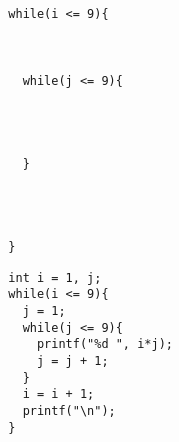 \documentclass[a4j]{jarticle}
\begin{document}
\begin{multicols*}{2}
\ifnum {}
\begin{verbatim}



  while(i <= 9){



    while(j <= 9){




    }




  }
\end{verbatim}
\vspace{1cm}
\else
\begin{verbatim}
  int i = 1, j;
  while(i <= 9){
    j = 1;
    while(j <= 9){
      printf("%d ", i*j);
      j = j + 1;
    }
    i = i + 1;
    printf("\n");
  }
\end{verbatim}
\vspace{5cm}
\fi




\vfill

\mbox{}


%
%
%
%
%
%
%
%
%
%
%
%
%
%
%
%
%
%
%
%
%
%
%
%
%
%
%





\end{multicols*}
\end{document}
